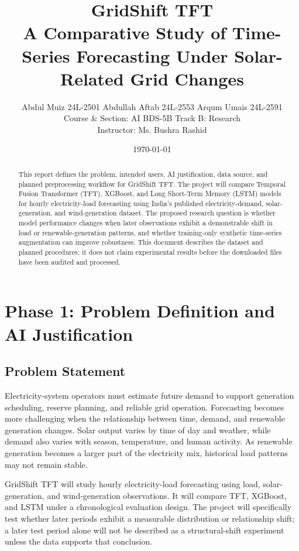 \documentclass[12pt,a4paper]{article}
\title{\textbf{GridShift TFT}\\
A Comparative Study of Time-Series Forecasting Under Solar-Related Grid Changes}
\author{Abdul Muiz 24L-2501 \textbar{} Abdullah Aftab 24L-2553 \textbar{} Arqum Umais 24L-2591\\
Course \& Section: AI BDS-5B \textbar{} Track B: Research \\
Instructor: Ms. Bushra Rashid}
\date{\today}
\begin{document}
\maketitle

\begin{abstract}
This report defines the problem, intended users, AI justification, data source, and planned preprocessing workflow for GridShift TFT. The project will compare Temporal Fusion Transformer (TFT), XGBoost, and Long Short-Term Memory (LSTM) models for hourly electricity-load forecasting using India's published electricity-demand, solar-generation, and wind-generation dataset. The proposed research question is whether model performance changes when later observations exhibit a demonstrable shift in load or renewable-generation patterns, and whether training-only synthetic time-series augmentation can improve robustness. This document describes the dataset and planned procedures; it does not claim experimental results before the downloaded files have been audited and processed.
\end{abstract}

\section{Phase 1: Problem Definition and AI Justification}

\subsection{Problem Statement}
Electricity-system operators must estimate future demand to support generation scheduling, reserve planning, and reliable grid operation. Forecasting becomes more challenging when the relationship between time, demand, and renewable generation changes. Solar output varies by time of day and weather, while demand also varies with season, temperature, and human activity. As renewable generation becomes a larger part of the electricity mix, historical load patterns may not remain stable.

GridShift TFT will study hourly electricity-load forecasting using load, solar-generation, and wind-generation observations. It will compare TFT, XGBoost, and LSTM under a chronological evaluation design. The project will specifically test whether later periods exhibit a measurable distribution or relationship shift; a later test period alone will not be described as a structural-shift experiment unless the data supports that conclusion.
\end{document}
